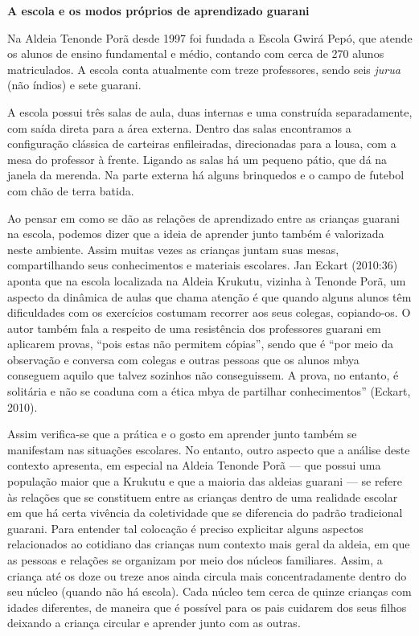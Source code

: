 \textbf{A escola e os modos próprios de aprendizado guarani}

Na Aldeia Tenonde Porã desde 1997 foi fundada a Escola Gwirá Pepó, que
atende os alunos de ensino fundamental e médio, contando com cerca de
270 alunos matriculados. A escola conta atualmente com treze
professores, sendo seis \emph{jurua} (não índios) e sete guarani.

A escola possui três salas de aula, duas internas e uma construída
separadamente, com saída direta para a área externa. Dentro das salas
encontramos a configuração clássica de carteiras enfileiradas,
direcionadas para a lousa, com a mesa do professor à frente. Ligando as
salas há um pequeno pátio, que dá na janela da merenda. Na parte externa
há alguns brinquedos e o campo de futebol com chão de terra batida.

Ao pensar em como se dão as relações de aprendizado entre as crianças
guarani na escola, podemos dizer que a ideia de aprender junto também é
valorizada neste ambiente. Assim muitas vezes as crianças juntam suas
mesas, compartilhando seus conhecimentos e materiais escolares. Jan
Eckart (2010:36) aponta que na escola localizada na Aldeia Krukutu,
vizinha à Tenonde Porã, um aspecto da dinâmica de aulas que chama
atenção é que quando alguns alunos têm dificuldades com os exercícios
costumam recorrer aos seus colegas, copiando-os. O autor também fala a
respeito de uma resistência dos professores guarani em aplicarem provas,
``pois estas não permitem cópias'', sendo que é ``por meio da observação
e conversa com colegas e outras pessoas que os alunos mbya conseguem
aquilo que talvez sozinhos não conseguissem. A prova, no entanto, é
solitária e não se coaduna com a ética mbya de partilhar conhecimentos''
(Eckart, 2010).

Assim verifica-se que a prática e o gosto em aprender junto também se
manifestam nas situações escolares. No entanto, outro aspecto que a
análise deste contexto apresenta, em especial na Aldeia Tenonde Porã ---
que possui uma população maior que a Krukutu e que a maioria das aldeias
guarani --- se refere às relações que se constituem entre as crianças
dentro de uma realidade escolar em que há certa vivência da coletividade
que se diferencia do padrão tradicional guarani. Para entender tal
colocação é preciso explicitar alguns aspectos relacionados ao cotidiano
das crianças num contexto mais geral da aldeia, em que as pessoas e
relações se organizam por meio dos núcleos familiares. Assim, a criança
até os doze ou treze anos ainda circula mais concentradamente dentro do
seu núcleo (quando não há escola). Cada núcleo tem cerca de quinze
crianças com idades diferentes, de maneira que é possível para os pais
cuidarem dos seus filhos deixando a criança circular e aprender junto
com as outras.

